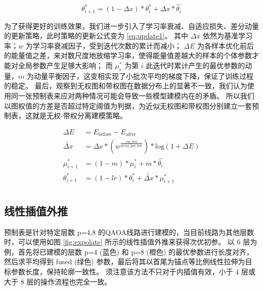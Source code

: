 \documentclass[withoutpreface,bwprint]{cumcmthesis}
\begin{document}
\begin{equation}
\theta_{i+1}^\ast = (1 - \Delta x) * \theta_i^\ast + \Delta x * \hat{\theta_i}
\label{eq:update0}
\end{equation}

为了获得更好的训练效果，我们进一步引入了学习率衰减、自适应损失、差分动量的更新策略，此时策略的更新公式变为 \ref{eq:update1}。
其中 $ \Delta x $ 依然为基准学习率；$ w $ 为学习率衰减因子，受到迭代次数的累计而减小；
$ \Delta E $ 为各样本优化前后的能量值之差，来对数尺度地放缩学习率，使得能量值差越大的样本的个体参数才能对全局参数产生足够大影响；
而 $ \mu_i^\ast $ 为第 $ i $ 此迭代时累计产生的最优参数的动量，$ m $ 为动量平衡因子，这变相实现了小批次平均的梯度下降，保证了训练过程的稳定。
最后，观察到无权图和带权图在数据分布上的显著不一致，我们认为使用同一张预制表来应对两种情况可能会导致一些模型建模内在的矛盾。
所以我们以图权值的方差是否超过特定阈值为判据，为近似无权图和带权图分别建立一套预制表，这就是无权-带权分离建模策略。

\begin{equation}
\begin{split}
\Delta E &= E_{\mathrm{before}} - E_{\mathrm{after}} \\
\tilde{\Delta x} &= \Delta x * (w^{\frac{\mathrm{cur\_iter}}{\mathrm{decay\_per\_iter}}}) * \mathrm{log}(1 + \Delta E) \\
\mu_{i+1}^\ast &= (1 - m) * \mu_i^\ast + m * \hat{\theta_i} \\
\theta_{i+1}^\ast &= (1 - lr) * \theta_i^\ast + \tilde{\Delta x} * \mu_{i+1}^\ast \\
\end{split}
\label{eq:update1}
\end{equation}

\subsection{线性插值外推}

预制表是针对特定层数 p=4,8 的QAOA线路进行建模的，当目前线路为其他层数时，可以使用如图 \ref{fig:expolate} 所示的线性插值外推来获得次优初参。
以 6 层为例，首先将已建模的层数 p=4 (蓝色) 和 p=8 (橙色) 的最优参数进行长度对齐，然后求平均得到 fused (绿色) 参数，最后将其以首尾为锚点等比例线性拉伸为目标参数长度，保持轮廓一致性。
须注意该方法不只对于内插值有效，小于 4 层或大于 8 层的操作流程也完全一致。
\end{document}

